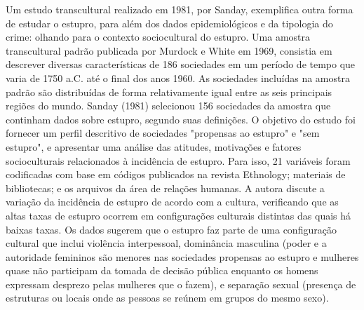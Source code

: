 Um estudo transcultural realizado em 1981, por Sanday, exemplifica outra forma de estudar o estupro, para além dos dados epidemiológicos e da tipologia do crime: olhando para o contexto sociocultural do estupro. Uma amostra transcultural padrão publicada por Murdock e White em 1969, consistia em descrever diversas características de 186 sociedades em um período de tempo que varia de 1750 a.C. até o final dos anos 1960. As sociedades incluídas na amostra padrão são distribuídas de forma relativamente igual entre as seis principais regiões do mundo. Sanday (1981) selecionou 156 sociedades da amostra que continham dados sobre estupro, segundo suas definições. O objetivo do estudo foi fornecer um perfil descritivo de sociedades "propensas ao estupro" e "sem estupro", e apresentar uma análise das atitudes, motivações e fatores socioculturais relacionados à incidência de estupro. Para isso, 21 variáveis foram codificadas com base em códigos publicados na revista Ethnology; materiais de bibliotecas; e os arquivos da área de relações humanas. A autora discute a variação da incidência de estupro de acordo com a cultura, verificando que as altas taxas de estupro ocorrem em configurações culturais distintas das quais há baixas taxas. Os dados sugerem que o estupro faz parte de uma configuração cultural que inclui violência interpessoal, dominância masculina (poder e a autoridade femininos são menores nas sociedades propensas ao estupro e mulheres quase não participam da tomada de decisão pública enquanto os homens expressam desprezo pelas mulheres que o fazem), e separação sexual (presença de estruturas ou locais onde as pessoas se reúnem em grupos do mesmo sexo).

